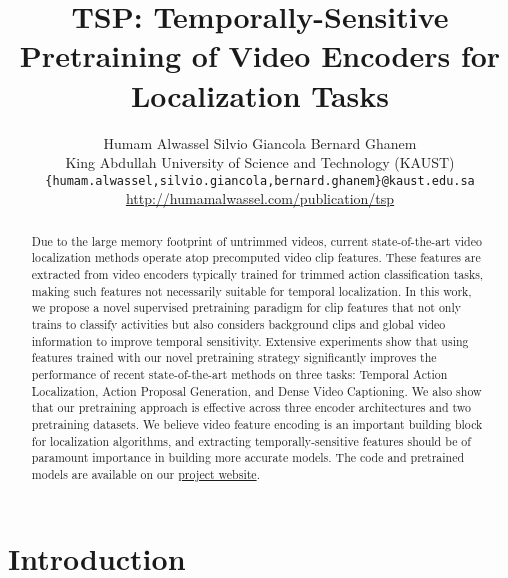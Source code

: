 \documentclass[10pt,twocolumn,letterpaper]{article}
\begin{document}
\title{TSP: Temporally-Sensitive Pretraining of Video Encoders for Localization Tasks} 

\author{
Humam Alwassel \quad
Silvio Giancola \quad
Bernard Ghanem \\
King Abdullah University of Science and Technology (KAUST) \\
{\tt\small\{humam.alwassel,silvio.giancola,bernard.ghanem\}@kaust.edu.sa} \\
{{{\url{http://humamalwassel.com/publication/tsp}}}}
}

\maketitle

\newcommand{\ahat}{\hat{\textbf{a}}}
\newcommand{\av}{\textbf{a}}
\newcommand{\bv}{\textbf{b}}
\newcommand{\cv}{\textbf{c}}
\newcommand{\dv}{\textbf{d}}
\newcommand{\uv}{\textbf{u}}
\newcommand{\vv}{\textbf{v}}
\newcommand{\x}{\textbf{x}}
\newcommand{\X}{\textbf{X}}
\newcommand{\y}{\textbf{y}}
\newcommand{\Y}{\textbf{Y}}
\newcommand{\z}{\textbf{z}}
\newcommand{\w}{\textbf{w}}
\newcommand{\W}{\textbf{W}}
\newcommand{\p}{\textbf{p}}
\newcommand{\q}{\textbf{q}}
\newcommand{\h}{\textbf{h}}
\newcommand{\A}{\textbf{A}}
\newcommand{\C}{\textbf{C}}
\newcommand{\D}{\textbf{D}}
\newcommand{\F}{\textbf{F}}
\newcommand{\V}{\textbf{V}}
\newcommand{\U}{\textbf{U}}
\newcommand{\I}{\textbf{I}}
\newcommand{\PX}{\textbf{P}}
\newcommand{\mSigma}{\mathbf{\Sigma}}
\newcommand{\0}{\mathbf{0}}
\newcommand{\1}{\mathbf{1}} 
\begin{abstract}
Due to the large memory footprint of untrimmed videos, current state-of-the-art video localization methods operate atop precomputed video clip features. These features are extracted from video encoders typically trained for trimmed action classification tasks, making such features not necessarily suitable for temporal localization. In this work, we propose a novel supervised pretraining paradigm for clip features that not only trains to classify activities but also considers background clips and global video information to improve temporal sensitivity. Extensive experiments show that using features trained with our novel pretraining strategy significantly improves the performance of recent state-of-the-art methods on three tasks: Temporal Action Localization, Action Proposal Generation, and Dense Video Captioning. We also show that our pretraining approach is effective across three encoder architectures and two pretraining datasets. We believe video feature encoding is an important building block for localization algorithms, and extracting temporally-sensitive features should be of paramount importance in building more accurate models.
The code and pretrained models are available on our \href{http://humamalwassel.com/publication/tsp/}{project website}.
\vspace{-10pt}
\end{abstract} \section{Introduction}\label{sec:introduction}
\end{document}
